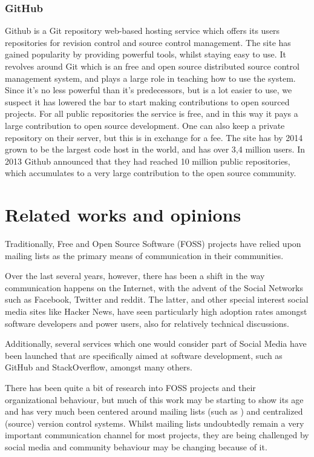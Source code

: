 \documentclass[a4paper,11pt]{article} %
\begin{document}
\subsubsection*{GitHub}

Github is a Git repository web-based hosting service which offers its users
repositories for revision control and source control management. The site
has gained popularity by providing powerful tools, whilst staying easy to
use. It revolves around Git which is an free and open source distributed
source control management system, and plays a large role in teaching how to
use the system. Since it’s no less powerful than it’s predecessors, but is a
lot easier to use, we suspect it has lowered the bar to start making
contributions to open sourced projects. For all public repositories the
service is free, and in this way it pays a large contribution to open source
development. One can also keep a private repository on their server, but
this is in exchange for a fee. The site has by 2014 grown to be the largest
code host in the world, and has over 3,4 million users. In 2013 Github
announced that they had reached 10 million public repositories, which
accumulates to a very large contribution to the open source community.

\section{Related works and opinions}

Traditionally, Free and Open Source Software (FOSS) projects have
relied upon mailing lists as the primary means of communication in
their communities. %

Over the last several years, however, there has been a shift in the
way communication happens on the Internet, with the advent of the
Social Networks such as Facebook, Twitter and reddit. The latter, and
other special interest social media sites like Hacker News, have seen
particularly high adoption rates amongst software developers and power
users, also for relatively technical discussions.

Additionally, several services which one would consider part of Social
Media have been launched that are specifically aimed at software
development, such as GitHub and StackOverflow, amongst many others.

There has been quite a bit of research into FOSS projects and their
organizational behaviour, but much of this work may be starting to
show its age and has very much been centered around mailing lists
(such as \cite{Oezbek10Cancer, singh2011network}) and centralized (source) version
control systems. Whilst mailing lists undoubtedly remain a very
important communication channel for most projects, they are being
challenged by social media and community behaviour may be changing
because of it.
\end{document}
